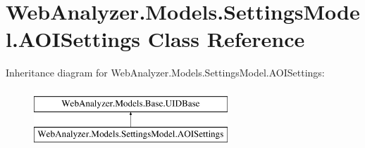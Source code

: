\hypertarget{class_web_analyzer_1_1_models_1_1_settings_model_1_1_a_o_i_settings}{}\section{Web\+Analyzer.\+Models.\+Settings\+Model.\+A\+O\+I\+Settings Class Reference}
\label{class_web_analyzer_1_1_models_1_1_settings_model_1_1_a_o_i_settings}
Inheritance diagram for Web\+Analyzer.\+Models.\+Settings\+Model.\+A\+O\+I\+Settings\+:\begin{figure}[H]
\begin{center}
\leavevmode
\includegraphics[height=2.000000cm]{class_web_analyzer_1_1_models_1_1_settings_model_1_1_a_o_i_settings}
\end{center}
\end{figure}
